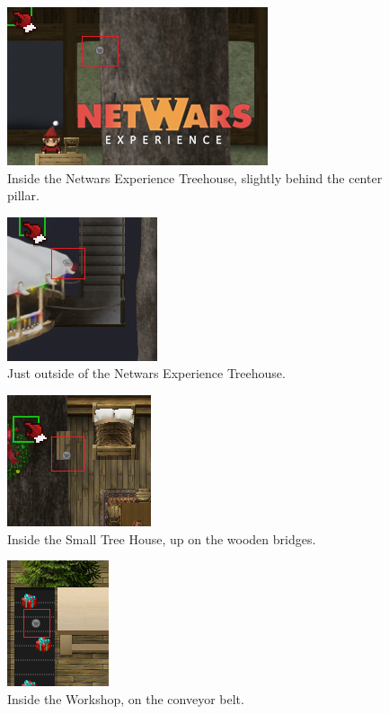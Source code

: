 \documentclass[writeup.tex]{subfiles}
\begin{document}
			\begin{figure}[H]
				\centering
				\includegraphics[scale=1]{"screenshots/coins/Netcoin - Netwars Experience Treehouse"}
				\caption{Inside the Netwars Experience Treehouse, slightly behind the center pillar.}
			\end{figure}
			
			\begin{figure}[H]
				\centering
				\includegraphics[scale=1]{"screenshots/coins/Netcoin - Right side of Netwars Experience Treehouse"}
				\caption{Just outside of the Netwars Experience Treehouse.}
			\end{figure}
			
			\begin{figure}[H]
				\centering
				\includegraphics[scale=1]{"screenshots/coins/Netcoin - Small Tree House"}
				\caption{Inside the Small Tree House, up on the wooden bridges.}
			\end{figure}
			
			\begin{figure}[H]
				\centering
				\includegraphics[scale=1]{"screenshots/coins/Netcoin - Workshop"}
				\caption{Inside the Workshop, on the conveyor belt.}
			\end{figure}
			
\end{document}

